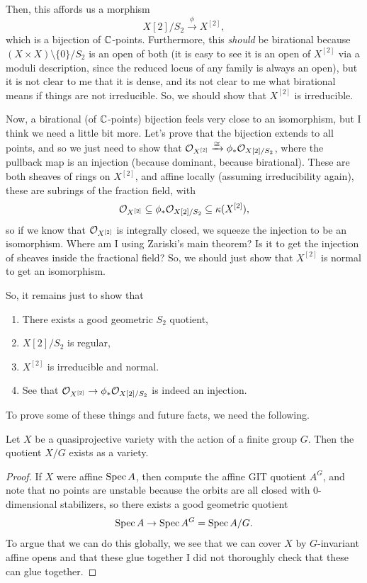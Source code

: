 \documentclass[12pt]{article}
\begin{document}
\begin{itemize}
    Then, this affords us a morphism
    \[X[2]/S_2 \xrightarrow{\phi} X^{[2]},\]
    which is a bijection of $\mathbb{C}$-points. Furthermore, this \textit{should} be birational because $(X\times X) \setminus \{0\}/S_2$ is an open of both (it is easy to see it is an open of $X^{[2]}$ via a moduli description, since the reduced locus of any family is always an open), but it is not clear to me that it is dense, and its not clear to me what birational means if things are not irreducible. So, we should show that $X^{[2]}$ is irreducible.

    Now, a birational (of $\mathbb{C}$-points) bijection feels very close to an isomorphism, but I think we need a little bit more. Let's prove that the bijection extends to all points, and so we just need to show that $\cO_{X^{[2]}} \xrightarrow{\cong} \phi_* \cO_{X[2]/S_2}$, where the pullback map is an injection (because dominant, because birational). These are both sheaves of rings on $X^{[2]}$, and affine locally (assuming irreducibility again), these are subrings of the fraction field, with
    \[\cO_{X^{[2]}} \subseteq \phi_* \cO_{X[2]/S_2} \subseteq \kappa(X^{[2]}),\]
    so if we know that $\mathcal{O}_{X^{[2]}}$ is integrally closed, we squeeze the injection to be an isomorphism. {\color{red} Where am I using Zariski's main theorem? Is it to get the injection of sheaves inside the fractional field?} So, we should just show that $X^{[2]}$ is normal to get an isomorphism.
    
    So, it remains just to show that
    \begin{enumerate}
        \item There exists a good geometric $S_2$ quotient,
        \item $X[2]/S_2$ is regular,
        \item $X^{[2]}$ is irreducible and normal.
        \item See that $\cO_{X^{[2]}} \to \phi_* \cO_{X[2]/S_2}$ is indeed an injection.
    \end{enumerate}

    To prove some of these things and future facts, we need the following.

    \begin{prop}
        Let $X$ be a quasiprojective variety with the action of a finite group $G$. Then the quotient $X/G$ exists as a variety.
    \end{prop}
    \begin{proof}
        If $X$ were affine $\operatorname{Spec} A$, then compute the affine GIT quotient $A^G$, and note that no points are unstable because the orbits are all closed with 0-dimensional stabilizers, so there exists a good geometric quotient
        \[\operatorname{Spec} A \to \operatorname{Spec} A^G= \operatorname{Spec} A/G.\]
        To argue that we can do this globally, we see that we can cover $X$ by $G$-invariant affine opens and that these glue together {\color{red} I did not thoroughly check that these can glue together}.


\end{proof}
\end{itemize}
\end{document}
